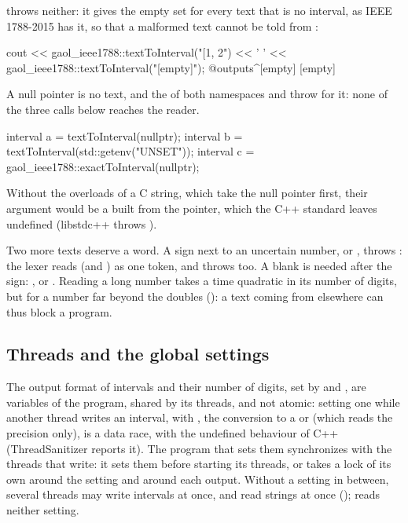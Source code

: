 \noindent
{} throws neither: it gives the empty set
for every text that is no interval, as IEEE 1788-2015 has it, so that a
malformed text cannot be told from :

\begin{example}
cout << gaol_ieee1788::textToInterval("[1, 2") << ' '
     << gaol_ieee1788::textToInterval("[empty]");
@outputs^[empty] [empty]~
\end{example}

\noindent
A null pointer is no text, and the  of both namespaces
and  throw  for it: none
of the three calls below reaches the reader.

\begin{example}
interval a = textToInterval(nullptr);
interval b = textToInterval(std::getenv("UNSET"));
interval c = gaol_ieee1788::exactToInterval(nullptr);
\end{example}

\noindent
Without the overloads of a C string, which take the null pointer first, their
argument would be a  built from the pointer, which the
C++ standard leaves undefined (libstdc++ throws
).\newinvfive

\medskip
Two more texts deserve a word. A sign next to an uncertain number,
 or , throws : the
lexer reads  (and ) as one token, and
 throws too. A blank is needed after the sign:
, or . Reading a long number takes a time
quadratic in its number of digits, but for a number far beyond the doubles
(): a text coming from elsewhere can thus block a
program.

\subsection{Threads and the global settings}
%
%

The output format of intervals and their number of digits, set by
 and , are variables of
the program, shared by its threads, and not atomic: setting one while another
thread writes an interval, with , the conversion to a
 or  (which reads
the precision only), is a data race, with the undefined behaviour of C++
(ThreadSanitizer reports it). The program that sets them synchronizes with
the threads that write: it sets them before starting its threads, or takes a
lock of its own around the setting and around each output. Without a setting
in between, several threads may write intervals at once, and read strings at
once ();  reads neither
setting.\newinvfive

